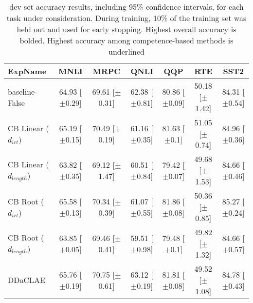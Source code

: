 \begin{table*}[ht]
\centering
\begingroup\small
\begin{tabular}{lcccccc}
  \toprule
ExpName & MNLI & MRPC & QNLI & QQP & RTE & SST2 \\ 
  \midrule
baseline-False & 64.93 [$\pm$0.29] & 69.61 [$\pm$0.31] & 62.38 [$\pm$0.81] & 80.86 [$\pm$0.09] & 50.18 [$\pm$1.42] & 84.31 [$\pm$0.54] \\ 
  CB Linear ($d_{irt}$) & 65.19 [$\pm$0.15] & 70.49 [$\pm$0.19] & 61.16 [$\pm$0.35] & 81.63 [$\pm$0.1] & 51.05 [$\pm$0.74] & 84.96 [$\pm$0.36] \\ 
  CB Linear ($d_{length}$) & 63.82 [$\pm$0.35] & 69.12 [$\pm$1.47] & 60.51 [$\pm$0.84] & 79.42 [$\pm$0.07] & 49.68 [$\pm$1.53] & 84.66 [$\pm$0.46] \\ 
  CB Root ($d_{irt}$) & 65.58 [$\pm$0.13] & 70.34 [$\pm$0.39] & 61.07 [$\pm$0.55] & 81.86 [$\pm$0.08] & 50.36 [$\pm$0.85] & 85.27 [$\pm$0.24] \\ 
  CB Root ($d_{length}$) & 63.85 [$\pm$0.05] & 69.46 [$\pm$0.41] & 59.51 [$\pm$0.98] & 79.48 [$\pm$0.1] & 49.82 [$\pm$1.32] & 84.66 [$\pm$0.57] \\ 
  DDaCLAE & 65.76 [$\pm$0.19] & 70.75 [$\pm$0.61] & 63.12 [$\pm$0.19] & 81.81 [$\pm$0.08] & 49.52 [$\pm$1.08] & 84.78 [$\pm$0.43] \\ 
   \bottomrule
\end{tabular}
\endgroup
\caption{dev set accuracy results, including 95\% confidence intervals, for each task under consideration. During training, 10\% of the training set was held out and used for early stopping. Highest overall accuracy is bolded. Highest accuracy among competence-based methods is underlined} 
\label{tab:acc_lstm-False}
\end{table*}
